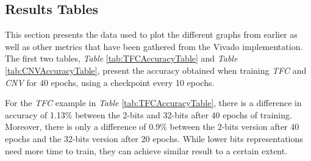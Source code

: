 \newpage
\subsection{Results Tables}

This section presents the data used to plot the different graphs from earlier as well as other metrics that have been gathered from the Vivado implementation. The first two tables, \emph{Table} \ref{tab:TFCAccuracyTable} and \emph{Table} \ref{tab:CNVAccuracyTable}, present the accuracy obtained when training \emph{TFC} and \emph{CNV} for 40 epochs, using a checkpoint every 10 epochs.

\begin{table}[!htb]
  \centering
\caption[TFC Accuracy Table]{TFC accuracy for different training times}
\label{tab:TFCAccuracyTable}
\end{table}


For the \emph{TFC} example in \emph{Table} \ref{tab:TFCAccuracyTable}, there is a difference in accuracy of 1.13\% between the 2-bits and 32-bits after 40 epochs of training. Moreover, there is only a difference of 0.9\% between the 2-bits version after 40 epochs and the 32-bits version after 20 epochs. While lower bits representations need more time to train, they can achieve similar result to a certain extent.

